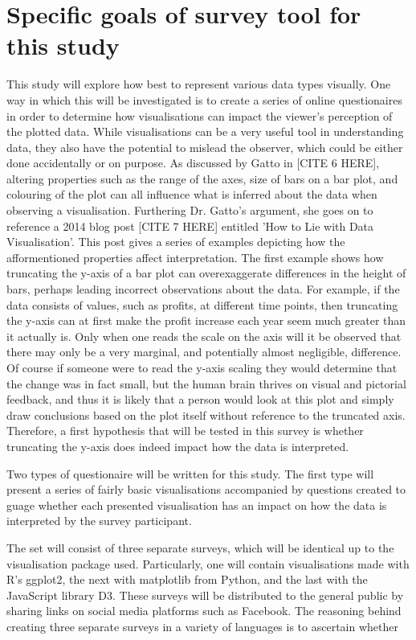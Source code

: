 \section{Specific goals of survey tool for this study}
This study will explore how best to represent various data types visually. One way in which this will be investigated is to create 
a series of online questionaires in order to determine how visualisations can impact the viewer's perception of the plotted data. 
While visualisations can be a very useful tool in understanding data, they also have the potential to mislead the observer, which 
could be either done accidentally or on purpose. As discussed by Gatto in [CITE 6 HERE], altering properties such as the range of 
the axes, size of bars on a bar plot, and colouring of the plot can all influence what is inferred about the data when observing 
a visualisation. Furthering Dr. Gatto's argument, she goes on to reference a 2014 blog post [CITE 7 HERE] entitled 'How to Lie with 
Data Visualisation'. This post gives a series of examples depicting how the afformentioned properties affect interpretation. The first 
example shows how truncating the y-axis of a bar plot can overexaggerate differences in the height of bars, perhaps leading incorrect 
observations about the data. For example, if the data consists of values, such as profits, at different time points, then truncating 
the y-axis can at first make the profit increase each year seem much greater than it actually is. Only when one reads the scale on the 
axis will it be observed that there may only be a very marginal, and potentially almost negligible, difference. Of course if someone 
were to read the y-axis scaling they would determine that the change was in fact small, but the human brain thrives on visual and 
pictorial feedback, and thus it is likely that a person would look at this plot and simply draw conclusions based on the plot itself
without reference to the truncated axis. Therefore, a first hypothesis that will be tested in this survey is whether truncating the y-axis
does indeed impact how the data is interpreted.



Two types of questionaire will be written for this study. The first type will present a series of fairly basic visualisations accompanied
by questions created to guage whether each presented visualisation has an impact on how the data is interpreted by the survey participant.


The set will consist of three separate surveys, which will be identical up to the visualisation package used. Particularly, one will contain 
visualisations made with R's ggplot2, the next with matplotlib from Python, and the last with the JavaScript library D3. These surveys will 
be distributed to the general public by sharing links on social media platforms such as Facebook. The reasoning behind creating three separate 
surveys in a variety of languages is to ascertain whether 






